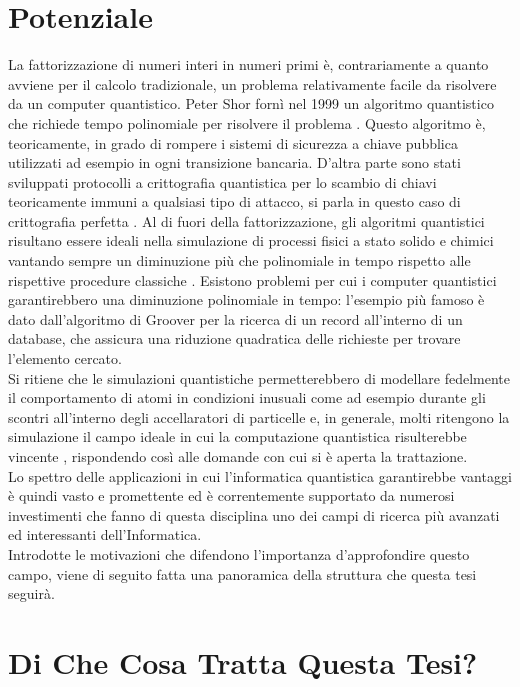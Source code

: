 \documentclass[12pt,a4paper,openright]{report}
\begin{document}
\section{Potenziale}
La fattorizzazione di numeri interi in numeri primi è, contrariamente a quanto avviene per il calcolo tradizionale, un problema relativamente facile da risolvere da un computer quantistico.
Peter Shor fornì nel 1999 un algoritmo quantistico che richiede tempo polinomiale per risolvere il problema \cite{ref25}. Questo algoritmo è, teoricamente, in grado di rompere i sistemi di sicurezza a
chiave pubblica utilizzati ad esempio in ogni transizione bancaria. D'altra parte sono stati sviluppati protocolli a crittografia quantistica per lo scambio di chiavi teoricamente immuni a qualsiasi tipo di 
attacco, si parla in questo caso di crittografia perfetta \cite{ref26}. Al di fuori della fattorizzazione, gli algoritmi quantistici risultano essere ideali nella simulazione di processi fisici a stato solido e chimici
vantando sempre un diminuzione più che polinomiale in tempo rispetto alle rispettive procedure classiche \cite{ref27}. Esistono problemi per cui i computer quantistici garantirebbero una diminuzione polinomiale 
in tempo: l'esempio più famoso è dato dall'algoritmo di Groover \cite{ref28} per la ricerca di un record all'interno di un database, che assicura una riduzione quadratica delle richieste per trovare l'elemento cercato.\\
Si ritiene che le simulazioni quantistiche permetterebbero di modellare fedelmente il comportamento di atomi in condizioni inusuali come ad esempio durante gli scontri all'interno degli accellaratori di particelle \cite{ref29} e,
in generale, molti ritengono la simulazione il campo ideale in cui la computazione quantistica risulterebbe vincente \cite{ref30}, rispondendo così alle domande con cui si è aperta la trattazione.\\
Lo spettro delle applicazioni in cui l'informatica quantistica garantirebbe vantaggi è quindi vasto e promettente ed è correntemente supportato da numerosi investimenti che fanno di questa disciplina uno dei 
campi di ricerca più avanzati ed interessanti dell'Informatica.\\
Introdotte le motivazioni che difendono l'importanza d'approfondire questo campo, viene di seguito fatta una panoramica della struttura che questa tesi seguirà.

\section{Di Che Cosa Tratta Questa Tesi?}
\end{document}
